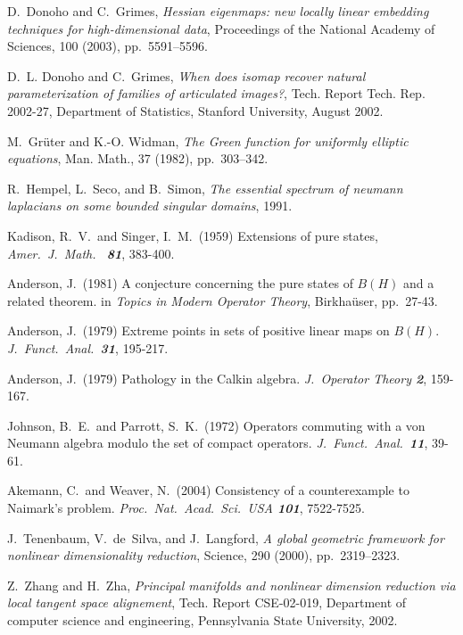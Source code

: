 \documentclass{pnastwo}
\begin{document}
\begin{article}
\begin{thebibliography}{10}
D.~Donoho and C.~Grimes, {\em Hessian eigenmaps: new locally linear
  embedding techniques for high-dimensional data}, Proceedings of the National
  Academy of Sciences, 100 (2003), pp.~5591--5596.

D.~L. Donoho and C.~Grimes, {\em When does isomap recover natural
  parameterization of families of articulated images?}, Tech. Report Tech. Rep.
  2002-27, Department of Statistics, Stanford University, August 2002.

M.~Gr\"uter and K.-O. Widman, {\em The {G}reen function for uniformly
  elliptic equations}, Man. Math., 37 (1982), pp.~303--342.

R.~Hempel, L.~Seco, and B.~Simon, {\em The essential spectrum of neumann
  laplacians on some bounded singular domains}, 1991.

Kadison, R.\ V.\ and Singer, I.\ M.\ (1959)
Extensions of pure states, {\it Amer.\ J.\ Math.\ \bf
81}, 383-400.

Anderson, J.\ (1981) A conjecture concerning the pure states of
$B(H)$ and a related theorem. in {\it Topics in Modern Operator
Theory}, Birkha\"user, pp.\ 27-43.

Anderson, J.\ (1979) Extreme points in sets of
positive linear maps on $B(H)$. {\it J.\ Funct.\
Anal.\
\bf 31}, 195-217.

Anderson, J.\ (1979) Pathology in the Calkin algebra. {\it J.\
Operator Theory \bf 2}, 159-167.

\bibitem{5}
Johnson, B.\ E.\ and Parrott, S.\ K.\ (1972) Operators commuting
with a von Neumann algebra modulo the set of compact operators.
{\it J.\ Funct.\ Anal.\ \bf 11}, 39-61.

\bibitem{6}
Akemann, C.\ and Weaver, N.\ (2004) Consistency of a
counterexample to Naimark's problem. {\it Proc.\ Nat.\ Acad.\
Sci.\ USA \bf 101}, 7522-7525.

\bibitem{TSL}
J.~Tenenbaum, V.~de~Silva, and J.~Langford, {\em A global geometric
  framework for nonlinear dimensionality reduction}, Science, 290 (2000),
  pp.~2319--2323.

\bibitem{ZhaZha}
Z.~Zhang and H.~Zha, {\em Principal manifolds and nonlinear dimension
  reduction via local tangent space alignement}, Tech. Report CSE-02-019,
  Department of computer science and engineering, Pennsylvania State
  University, 2002.
\end{thebibliography}


\end{article}
\end{document}
